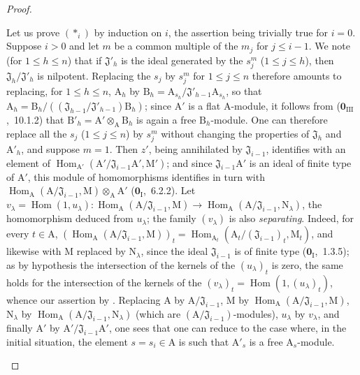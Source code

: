 \begin{proof}
\begin{enumerate}[label=(\roman*)]
  Let us prove $(*_i)$ by induction on $i$, the assertion being trivially true for $i=0$.
  Suppose $i>0$ and let $m$ be a common multiple of the $m_j$ for $j\leq i-1$.
  We note (for $1\leq h\leq n$) that if $\mathfrak{J}'_h$ is the ideal generated by the $s_j^m$ ($1\leq j\leq h$), then $\mathfrak{J}_h/\mathfrak{J}'_h$ is nilpotent.
  Replacing the $s_j$ by $s_j^m$ for $1\leq j\leq n$ therefore amounts to replacing, for $1\leq h\leq n$, $\mathrm{A}_h$ by
  $\mathrm{B}_h=\mathrm{A}_{s_h}/\mathfrak{J}'_{h-1}\mathrm{A}_{s_h}$, so that
  $\mathrm{A}_h=\mathrm{B}_h/((\mathfrak{J}_{h-1}/\mathfrak{J}'_{h-1})\mathrm{B}_h)$; since $\mathrm{A}'$ is a flat $\mathrm{A}$-module, it follows from ($\mathbf{0}_{\mathrm{III}}$,~10.1.2) that $\mathrm{B}'_h=\mathrm{A}'\otimes_\mathrm{A}\mathrm{B}_h$ is again a free $\mathrm{B}_h$-module.
  One can therefore
  replace all the $s_j$ ($1\leq j\leq n$) by $s_j^m$ without changing the properties of $\mathfrak{J}_h$ and $\mathrm{A}'_h$, and suppose $m=1$.
  Then $z'$, being annihilated by $\mathfrak{J}_{i-1}$, identifies with an element of $\operatorname{Hom}_{\mathrm{A}'}(\mathrm{A}'/\mathfrak{J}_{i-1}\mathrm{A}',\mathrm{M}')$; and since $\mathfrak{J}_{i-1}\mathrm{A}'$ is an ideal of finite type of $\mathrm{A}'$, this module of homomorphisms identifies in turn with $\operatorname{Hom}_\mathrm{A}(\mathrm{A}/\mathfrak{J}_{i-1},\mathrm{M})\otimes_\mathrm{A}\mathrm{A}'$ ($\mathbf{0}_{\mathrm{I}}$,~6.2.2).
  Let $v_\lambda=\operatorname{Hom}(1,u_\lambda):\operatorname{Hom}_\mathrm{A}(\mathrm{A}/\mathfrak{J}_{i-1},\mathrm{M})\to\operatorname{Hom}_\mathrm{A}(\mathrm{A}/\mathfrak{J}_{i-1},\mathrm{N}_\lambda)$, the homomorphism deduced from $u_\lambda$; the family $(v_\lambda)$ is also \emph{separating}.
  Indeed, for every $t\in\mathrm{A}$,
  $(\operatorname{Hom}_\mathrm{A}(\mathrm{A}/\mathfrak{J}_{i-1},\mathrm{M}))_t
  =\operatorname{Hom}_{\mathrm{A}_t}(\mathrm{A}_t/(\mathfrak{J}_{i-1})_t,\mathrm{M}_t)$,
  and likewise with $\mathrm{M}$ replaced by $\mathrm{N}_\lambda$, since the ideal $\mathfrak{J}_{i-1}$ is of finite type ($\mathbf{0}_{\mathrm{I}}$,~1.3.5); as by hypothesis the intersection of the kernels of the $(u_\lambda)_t$ is zero, the same holds for the intersection of the kernels of the $(v_\lambda)_t=\operatorname{Hom}(1,(u_\lambda)_t)$, whence our assertion by .
  Replacing $\mathrm{A}$ by $\mathrm{A}/\mathfrak{J}_{i-1}$, $\mathrm{M}$ by $\operatorname{Hom}_\mathrm{A}(\mathrm{A}/\mathfrak{J}_{i-1},\mathrm{M})$, $\mathrm{N}_\lambda$ by $\operatorname{Hom}_\mathrm{A}(\mathrm{A}/\mathfrak{J}_{i-1},\mathrm{N}_\lambda)$ (which are $(\mathrm{A}/\mathfrak{J}_{i-1})$-modules), $u_\lambda$ by $v_\lambda$, and finally $\mathrm{A}'$ by $\mathrm{A}'/\mathfrak{J}_{i-1}\mathrm{A}'$, one sees that one can reduce to the case where, in the initial situation, the element $s=s_i\in\mathrm{A}$ is such that $\mathrm{A}'_s$ is a free $\mathrm{A}_s$-module.

\end{enumerate}
\end{proof}
